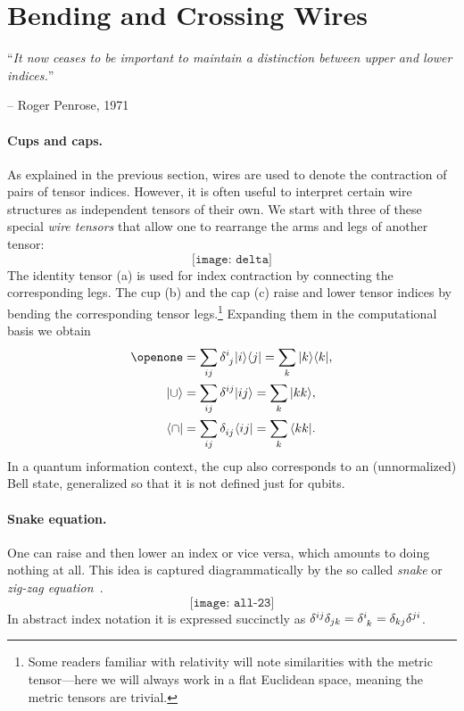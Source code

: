 \documentclass[aps,pra,12pt,nofootinbib,superscriptaddress,longbibliography]{revtex4-1}
\theoremstyle{plain}
\theoremstyle{definition}
\newcommand{\bra}[1]{\mbox{$\langle #1|$}}
\newcommand{\ket}[1]{\mbox{$|#1\rangle$}}
\newcommand{\I}{\openone}     %
\newcommand{\be}{\begin{equation}}
\newcommand{\ee}{\end{equation}}
\begin{document}
\section{Bending and Crossing Wires}\label{sec:wires}

\noindent ``\emph{It now ceases to be important to maintain a distinction 
between upper and lower indices.}''

{\hfill -- Roger Penrose, 1971 \cite{Penrose}}  \\ 


\paragraph{{\bf Cups and caps.}}
As explained in the previous section, wires are used to denote the contraction of pairs of tensor indices.
However, it is often useful to interpret certain wire structures as independent tensors of their own.
We start with three of these special \emph{wire tensors} that
allow one to rearrange the arms and legs of another tensor:
\be
\texttt{[image: delta]}
\ee
The identity tensor (a) is used for index contraction
by connecting the corresponding legs. The cup (b) and the cap (c) raise and lower tensor indices
by bending the corresponding tensor legs.\footnote{Some readers familiar with relativity will note similarities with the metric tensor---here we will always work in a flat Euclidean space, meaning the metric tensors are trivial.}
Expanding them in the computational basis we obtain
\begin{align}
\I &= \sum_{ij} \delta\indices{^i_j}\ket{i}\bra{j} =\sum_k\ket{k}\bra{k},\\
 \ket{\cup} &= \sum_{ij} \delta\indices{^{ij}}\ket{ij} = \sum_k\ket{kk},\\
\bra{\cap} &= \sum_{ij} \delta\indices{_{ij}}\bra{ij} = \sum_k\bra{kk}.
\end{align}
In a quantum information context, the cup
also corresponds to an (unnormalized) Bell state, generalized so that it is not defined just for qubits. 



\paragraph{{\bf Snake equation.}}\label{para:snake}
One can raise and then lower an index or vice versa, which
amounts to doing nothing at all. This idea
is captured diagrammatically by the so called \emph{snake} or
\emph{zig-zag equation}~\cite{Penrose}.
\be
 \texttt{[image: all-23]}\label{eqn:snake}
\ee
In abstract index notation it is expressed succinctly as
$\delta^{ij} \delta_{jk} = \delta\indices{^i_{k}} = \delta_{kj} \delta^{ji}$.
\end{document}
